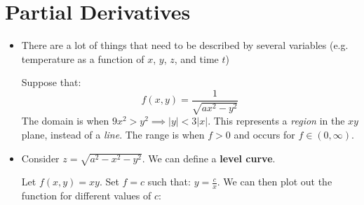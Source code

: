 \section{Partial Derivatives}
\begin{itemize}
    \item There are a lot of things that need to be described by several variables (e.g. temperature as a function of $x$, $y$, $z$, and time $t$)
    \begin{example}
        Suppose that:
        \begin{equation}
            f(x,y) = \frac{1}{\sqrt{ax^2-y^2}}
        \end{equation}
        The domain is when $9x^2 > y^2 \implies |y| < 3|x|$. This represents a \textit{region} in the $xy$ plane, instead of a \textit{line}. The range is when $f>0$ and occurs for $f \in (0,\infty)$.
    \end{example}
    \item Consider $z=\sqrt{a^2-x^2-y^2}$. We can define a \textbf{level curve}.
    \begin{example}
        Let $f(x,y)=xy$. Set $f=c$ such that: $y=\frac{c}{x}$. We can then plot out the function for different values of $c$:
        \begin{center}
\end{center}
\end{example}
\end{itemize}
